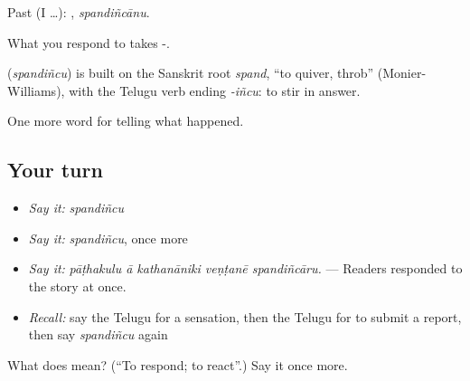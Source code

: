 Past (I …): , \emph{spandiñcānu}.

What you respond to takes -.

\begin{cousinweb}
\textbf{} (\emph{spandiñcu}) is built on the Sanskrit root \emph{spand}, \textquotedblleft{}to quiver, throb\textquotedblright{} (Monier-Williams), with the Telugu verb ending \emph{-iñcu}: to stir in answer.
\end{cousinweb}

\begin{grammarlens}[title={What you've built}]
One more word for telling what happened.
\end{grammarlens}

\subsection*{Your turn}
\begin{itemize}
\raggedright
  \item \emph{Say it:} \emph{spandiñcu}
  \item \emph{Say it:} \emph{spandiñcu}, once more
  \item \emph{Say it:} \emph{pāṭhakulu ā kathanāniki veṇṭanē spandiñcāru.} — Readers responded to the story at once.
  \item \emph{Recall:} say the Telugu for a sensation, then the Telugu for to submit a report, then say \emph{spandiñcu} again
\end{itemize}

\begin{tcolorbox}[breakable,colback=teal!4,colframe=teal!35!black,title={Before you move on}]
What does  mean? (\textquotedblleft{}To respond; to react\textquotedblright{}.) Say it once more.
\end{tcolorbox}
